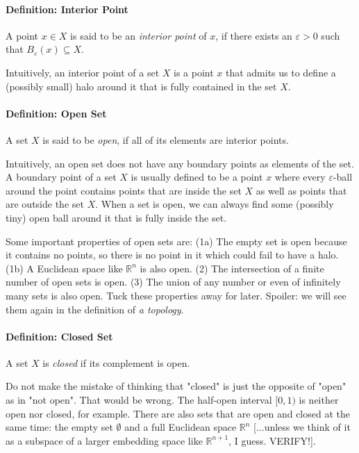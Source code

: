 \paragraph{Definition: Interior Point} A point $x \in X$ is said to be an \emph{interior point} of $x$, if there exists an $\varepsilon > 0$ such that $B_\varepsilon(x) \subseteq X$. 


\medskip
Intuitively, an interior point of a set $X$ is a point $x$ that admits us to define a (possibly small) halo around it that is fully contained in the set $X$.

\paragraph{Definition: Open Set} A set $X$ is said to be \emph{open}, if all of its elements are interior points. 

\medskip
Intuitively, an open set does not have any boundary points as elements of the set. A boundary point of a set $X$ is usually defined to be a point $x$ where every $\varepsilon$-ball around the point contains points that are inside the set $X$ as well as points that are outside the set $X$. When a set is open, we can always find some (possibly tiny) open ball around it that is fully inside the set. 

\medskip
Some important properties of open sets are: (1a) The empty set is open because it contains no points, so there is no point in it which could fail to have a halo. (1b) A Euclidean space like $\mathbb{R}^n$ is also open. (2) The intersection of a finite number of open sets is open. (3) The union of any number or even of infinitely many sets is also open. Tuck these properties away for later. Spoiler: we will see them again in the definition of \emph{a topology}.


\paragraph{Definition: Closed Set} A set $X$ is \emph{closed} if its complement is open.

\medskip
Do not make the mistake of thinking that "closed" is just the opposite of "open" as in "not open". That would be wrong. The half-open interval $[0,1)$ is neither open nor closed, for example. There are also sets that are open and closed at the same time: the empty set $\emptyset$ and a full Euclidean space $\mathbb{R}^n$ [...unless we think of it as a subspace of a larger embedding space like $\mathbb{R}^{n+1}$, I guess. VERIFY!]. 

